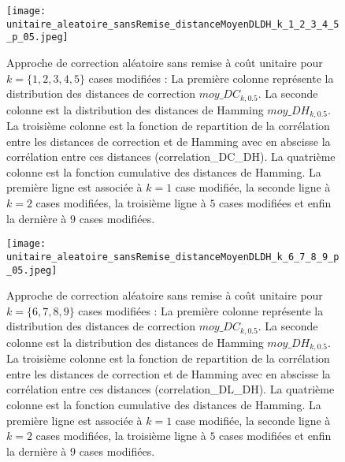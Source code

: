 \label{annexe_distribution_0_9}

\begin{figure}[htb!] 
\centering
\texttt{[image: unitaire\_aleatoire\_sansRemise\_distanceMoyenDLDH\_k\_1\_2\_3\_4\_5\_p\_05.jpeg]}
\caption{ Approche de correction al\'eatoire sans remise \`a co\^ut unitaire pour $k =\{1,2,3,4,5\} $ cases modifi\'ees : La premi\`ere colonne repr\'esente la distribution des distances de correction $moy\_DC_{k,0.5}$. La seconde colonne est la distribution des distances de Hamming $moy\_DH_{k,0.5}$. La troisi\`eme colonne  est la fonction de repartition de la corr\'elation entre les distances de correction et de Hamming avec en abscisse la corr\'elation entre ces distances (correlation\_DC\_DH).  La quatri\`eme colonne est la fonction cumulative des distances de Hamming. La premi\`ere ligne est associ\'ee \`a $k=1$ case modifi\'ee, la seconde ligne \`a $k=2$ cases modifi\'ees, la troisi\`eme ligne \`a $5$ cases modifi\'ees et enfin la derni\`ere \`a $9$ cases modifi\'ees.}
\label{sansremise_unitaire_distanceMoyenDCDH_k_1_5_aleatoire_p_05} 
\end{figure}
\FloatBarrier

\begin{figure}[htb!] 
\centering
\texttt{[image: unitaire\_aleatoire\_sansRemise\_distanceMoyenDLDH\_k\_6\_7\_8\_9\_p\_05.jpeg]}
\caption{ Approche de correction al\'eatoire sans remise \`a co\^ut unitaire pour $k =\{6,7,8,9\} $ cases modifi\'ees : La premi\`ere colonne repr\'esente la distribution des distances de correction $moy\_DC_{k,0.5}$. La seconde colonne est la distribution des distances de Hamming $moy\_DH_{k,0.5}$. La troisi\`eme colonne  est la fonction de repartition de la corr\'elation entre les distances de correction et de Hamming avec en abscisse la corr\'elation entre ces distances (correlation\_DL\_DH).  La quatri\`eme colonne est la fonction cumulative des distances de Hamming. La premi\`ere ligne est associ\'ee \`a $k=1$ case modifi\'ee, la seconde ligne \`a $k=2$ cases modifi\'ees, la troisi\`eme ligne \`a $5$ cases modifi\'ees et enfin la derni\`ere \`a $9$ cases modifi\'ees.}
\label{sansremise_unitaire_distanceMoyenDCDH_k_6_9_aleatoire_p_05} 
\end{figure}

